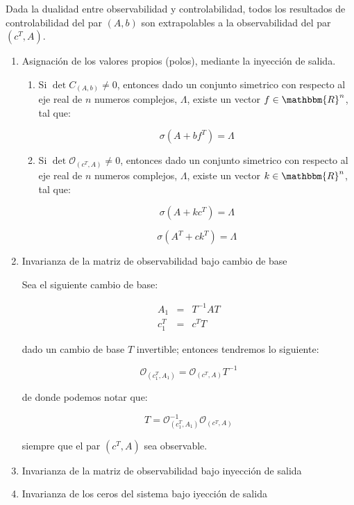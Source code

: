 		Dada la dualidad entre observabilidad y controlabilidad, todos los resultados de controlabilidad del par $(A, b)$ son extrapolables a la observabilidad del par $(c^T, A)$.

		\begin{enumerate}
			\item Asignación de los valores propios (polos), mediante la inyección de salida.

			\begin{enumerate}
				\item Si $\det{C_{(A, b)}} \ne 0$, entonces dado un conjunto simetrico con respecto al eje real de $n$ numeros complejos, $\Lambda$, existe un vector $f \in \mathbbm{R}^n$, tal que:

				\begin{equation*}
					\sigma(A + b f^T) = \Lambda
				\end{equation*}

				\item Si $\det{\mathcal{O}_{(c^T, A)}} \ne 0$, entonces dado un conjunto simetrico con respecto al eje real de $n$ numeros complejos, $\Lambda$, existe un vector $k \in \mathbbm{R}^n$, tal que:

				\begin{equation*}
					\sigma(A + k c^T) = \Lambda
				\end{equation*}

				\begin{equation*}
					\sigma(A^T + c k^T) = \Lambda
				\end{equation*}
			\end{enumerate}

			\item Invarianza de la matriz de observabilidad bajo cambio de base

			Sea el siguiente cambio de base:

			\begin{eqnarray}
				A_1 & = & T^{-1} A T \\
				c_1^T & = & c^T T
			\end{eqnarray}

			dado un cambio de base $T$ invertible; entonces tendremos lo siguiente:

			\begin{equation}
				\mathcal{O}_{(c_1^T, A_1)} = \mathcal{O}_{(c^T, A)} T^{-1}
			\end{equation}

			de donde podemos notar que:

			\begin{equation}
				T = \mathcal{O}_{(c_1^T, A_1)}^{-1} \mathcal{O}_{(c^T, A)}
			\end{equation}

			siempre que el par $(c^T, A)$ sea observable.

			\item Invarianza de la matriz de observabilidad bajo inyección de salida

			\item Invarianza de los ceros del sistema bajo iyección de salida
		\end{enumerate}

